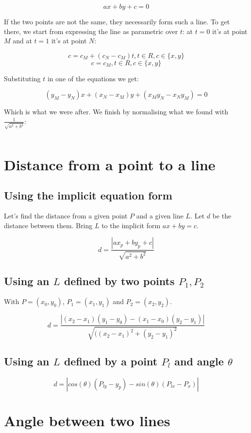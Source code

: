 \documentclass[12pt,a4,oneside,usenames,dvipsnames]{book}
\begin{document}
$$ax+by+c=0$$

If the two points are not the same, they necessarily form such a line. To get there, we start from expressing the line as parametric over $t$: at $t=0$ it's at point $M$ and at $t=1$ it's at point $N$:

$$c = c_M + (c_N - c_M)t, t\in R, c \in \{x, y\}$$
$$c = c_M, t\in R, c \in \{x, y\}$$

Substituting $t$ in one of the equations we get:

$$(y_M - y_N)x + (x_N-x_M)y+(x_{M}y_{N}-x_{N}y_{M})=0$$

Which is what we were after. We finish by normalising what we found with $\frac{1}{\sqrt{a^2+b^2}}$:
\begin{verbatim}
\end{verbatim}

\chapter{Distance from a point to a line}
\begin{center}

\end{center}

\section{Using the implicit equation form}
Let's find the distance from a given point $P$ and a given line $L$. Let $d$ be the distance between them. Bring $L$ to the implicit form $ax+by=c$.

$$d= \frac{|ax_p+by_p+c|}{\sqrt{a^2+b^2}}$$

\section{Using an $L$ defined by two points $P_1, P_2$}
With $P=(x_0, y_0)$, $P_1 = (x_1, y_1)$ and $P_2 = (x_2, y_2)$.

$$d=\frac{|(x_2-x_1)(y_1-y_0)-(x_1-x_0)(y_2-y_1)|}{\sqrt{((x_2-x_1)^2+(y_2-y_1)^2}}$$
\section{Using an $L$ defined by a point $P_l$ and angle $θ$}

$$d=|cos(θ)(P_{ly}-y_p)-sin(θ)(P_{lx} - P_x)|$$

\chapter{Angle between two lines}
\end{document}
